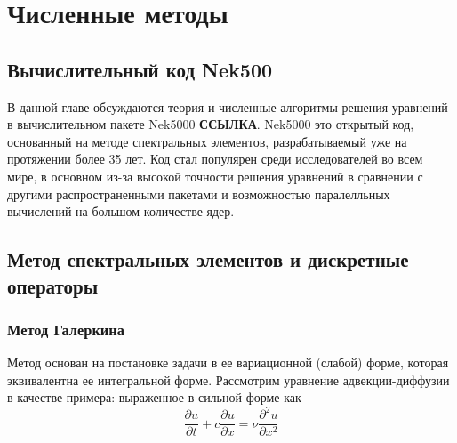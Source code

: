 \chapter{Численные методы}\label{ch:methods}

\section{Вычислительный код Nek500}\label{sec:ch1/nek5000}

В данной главе обсуждаются теория и численные алгоритмы решения уравнений в 
вычислительном пакете Nek5000 \textbf{ССЫЛКА}. 
%
Nek5000 это открытый код, основанный на методе спектральных элементов, разрабатываемый
уже на протяжении более 35 лет.
%
Код стал популярен среди исследователей во всем мире, в основном из-за высокой точности решения уравнений 
в сравнении с другими распространенными пакетами и возможностью паралелльных вычислений 
на большом количестве ядер.
%
\section{Метод спектральных элементов и дискретные операторы}

%
\subsection{Метод Галеркина}
%
Метод основан на постановке задачи в ее вариационной (слабой) форме, которая
эквивалентна ее интегральной форме.
%
Рассмотрим уравнение адвекции-диффузии в качестве примера: выраженное в сильной форме как
%
\begin{equation}
    \frac{\partial u}{\partial t} + c \frac{\partial u}{\partial x} = 
    \nu \frac{\partial^2 u}{\partial x^2}
\end{equation}
%


